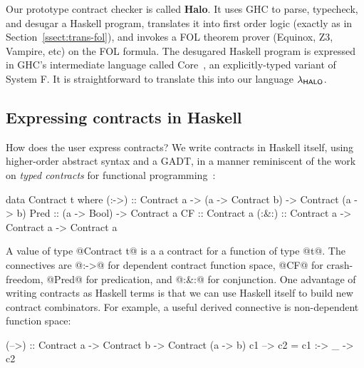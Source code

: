 Our prototype contract checker is called \textbf{Halo}.
It uses GHC to parse, typecheck, and desugar a Haskell program,
translates it into first order logic (exactly as in Section~\ref{ssect:trans-fol}), and
invokes a FOL theorem prover (Equinox, Z3, Vampire, etc) on the FOL formula.
The desugared Haskell program is expressed in GHC's intermediate language
called Core~\cite{Sulzmann:2007:SFT:1190315.1190324}, an explicitly-typed 
variant of System F.  It is straightforward
to translate this into our language $\lambda_{\sf HALO}$.

\subsection{Expressing contracts in Haskell}

How does the user express contracts?  We write contracts in Haskell
itself, using higher-order abstract syntax and a GADT, in 
a manner reminiscent 
of the work on {\em typed contracts} for functional 
programming~\cite{Hinze:2006:TCF:2100071.2100093}:
\begin{code}
data Contract t where
  (:->) :: Contract a 
        -> (a -> Contract b)
        -> Contract (a -> b)
  Pred  :: (a -> Bool) -> Contract a
  CF    :: Contract a
  (:&:) :: Contract a -> Contract a -> Contract a
\end{code}
A value of type @Contract t@ is a 
a contract for a function of type @t@.
The connectives are @:->@ for dependent contract function space, @CF@
for crash-freedom, @Pred@ for predication, and
@:&:@ for conjunction. 
One advantage of writing contracts as Haskell terms is that
we can use Haskell itself to build new contract combinators.
For example, a useful derived connective is non-dependent function space:
\par {\small
\begin{code}
(-->) :: Contract a -> Contract b -> Contract (a -> b)
c1 --> c2 = c1 :-> \_ -> c2
\end{code}
} \par
%
%

